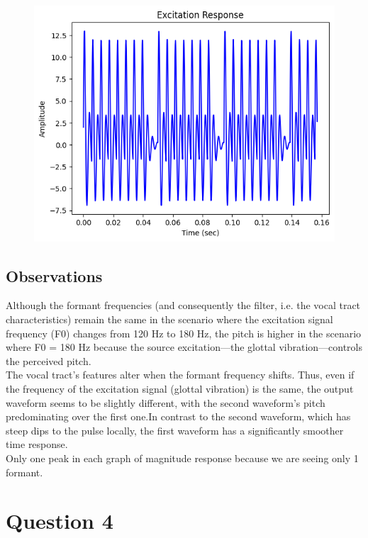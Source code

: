 \documentclass{article}
\begin{document}
\begin{figure}[H]
\begin{center}
\includegraphics[scale = 0.5]{Q3_CR.png}
\end{center}
\end{figure}

\subsection{Observations}
Although the formant frequencies (and consequently the filter, i.e. the vocal tract characteristics) remain the same in the scenario where the excitation signal frequency (F0) changes from 120 Hz to 180 Hz, the pitch is higher in the scenario where F0 = 180 Hz because the source excitation—the glottal vibration—controls the perceived pitch.\\

The vocal tract's features alter when the formant frequency shifts. Thus, even if the frequency of the excitation signal (glottal vibration) is the same, the output waveform seems to be slightly different, with the second waveform's pitch predominating over the first one.In contrast to the second waveform, which has steep dips to the pulse locally, the first waveform has a significantly smoother time response. \\

Only one peak in each graph of magnitude response because we are seeing only 1 formant.

\section{Question 4}
\end{document}
